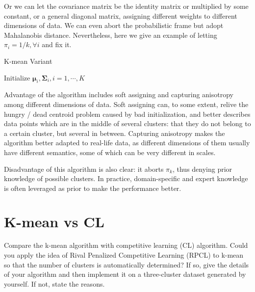 \documentclass[12pt,a4paper,UTF8,fntef]{article}
\begin{document}
Or we can let the covariance matrix be the identity matrix or multiplied by some constant, or a general diagonal matrix, assigning different weights to different dimensions of data. We can even abort the probabilistic frame but adopt Mahalanobis distance. Nevertheless, here we give an example of letting $\pi_i=1/k, \forall i$ and fix it.\newline
\begin{algorithm}[H]
	\caption{K-mean Variant}
	\BlankLine
	Initialize $\mathbf{\mu}_i, \mathbf{\Sigma}_i, i=1,\cdots,K$\\
\end{algorithm}

Advantage of the algorithm includes soft assigning and capturing anisotropy among different dimensions of data. Soft assigning can, to some extent, relive the hungry / dead centroid problem caused by bad initialization, and better describes data points which are in the middle of several clusters: that they do not belong to a certain cluster, but several in between. Capturing anisotropy makes the algorithm better adapted to real-life data, as different dimensions of them usually have different semantics, some of which can be very different in scales.

Disadvantage of this algorithm is also clear: it aborts $\pi_k$, thus denying prior knowledge of possible clusters. In practice, domain-specific and expert knowledge is often leveraged as prior to make the performance better. 
\section{K-mean vs CL}
Compare the k-mean algorithm with competitive learning (CL) algorithm. Could you apply the idea of Rival Penalized Competitive Learning (RPCL) to k-mean so that the number of clusters is automatically determined? If so, give the details of your algorithm and then implement it on a three-cluster dataset generated by yourself. If not, state the reasons.
\end{document}
